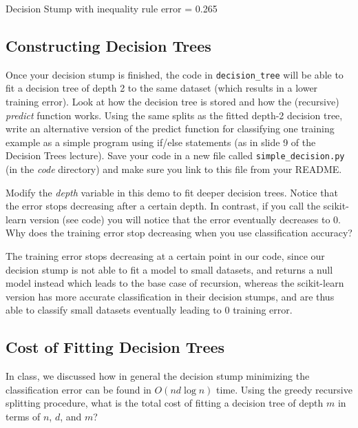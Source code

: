 \documentclass{article}
\def\blu#1{{\color{blu}#1}}
\begin{document}
Decision Stump with inequality rule error = 0.265

\subsection{Constructing Decision Trees}

Once your decision stump is finished, the code in \texttt{decision\string_tree} will be able to fit a decision tree of depth 2 to the same dataset (which results in a lower training error). Look at how the decision tree is stored and how the (recursive) \emph{predict} function works. \blu{Using the same splits as the fitted depth-2 decision tree, write an alternative version of the predict function for classifying one training example as a simple program using if/else statements (as in slide 9 of the Decision Trees lecture).} Save your code in a new file called \texttt{simple\string_decision.py} (in the \emph{code} directory) and make sure you link to this file from your README.


Modify the \emph{depth} variable in this demo to fit deeper decision trees. Notice that the error stops decreasing after a certain depth.
In contrast, if you call the scikit-learn version (see code) you will notice that the error eventually decreases to 0.
\blu{Why does the training error stop decreasing when you use classification accuracy?}

The training error stops decreasing at a certain point in our code, since our decision stump is not able to fit a model to small datasets, and returns a null model instead which leads to the base case of recursion, whereas the scikit-learn version has more accurate classification in their decision stumps, and are thus able to classify small datasets eventually leading to 0 training error.

\subsection{Cost of Fitting Decision Trees}

In class, we discussed how in general the decision stump minimizing the classification error can be found in $O(nd\log n)$ time. Using the greedy recursive splitting procedure, \blu{what is the total cost of fitting a decision tree of depth $m$ in terms of $n$, $d$, and $m$?}
\end{document}
